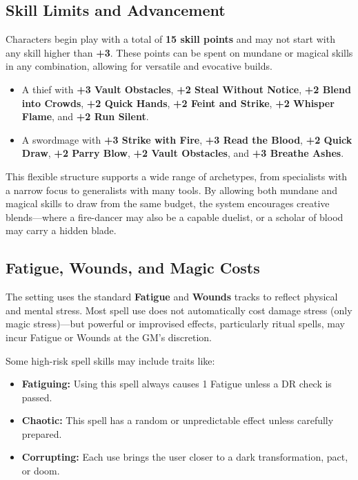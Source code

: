 \subsection{Skill Limits and Advancement}

Characters begin play with a total of \textbf{15 skill points} and may not start with any skill higher than \textbf{+3}. These points can be spent on mundane or magical skills in any combination, allowing for versatile and evocative builds.

\begin{itemize}\raggedright
    \item A thief with \textbf{+3 Vault Obstacles}, \textbf{+2 Steal Without Notice}, \textbf{+2 Blend into Crowds}, \textbf{+2 Quick Hands}, \textbf{+2 Feint and Strike}, \textbf{+2 Whisper Flame}, and \textbf{+2 Run Silent}.
    
    \item A swordmage with \textbf{+3 Strike with Fire}, \textbf{+3 Read the Blood}, \textbf{+2 Quick Draw}, \textbf{+2 Parry Blow}, \textbf{+2 Vault Obstacles}, and \textbf{+3 Breathe Ashes}.
\end{itemize}

This flexible structure supports a wide range of archetypes, from specialists with a narrow focus to generalists with many tools. By allowing both mundane and magical skills to draw from the same budget, the system encourages creative blends—where a fire-dancer may also be a capable duelist, or a scholar of blood may carry a hidden blade.

\subsection{Fatigue, Wounds, and Magic Costs}

The setting uses the standard \textbf{Fatigue} and \textbf{Wounds} tracks to reflect physical and mental stress. Most spell use does not automatically cost damage stress (only magic stress)—but powerful or improvised effects, particularly ritual spells, may incur Fatigue or Wounds at the GM’s discretion.

Some high-risk spell skills may include traits like:

\begin{itemize}
    \item \textbf{Fatiguing:} Using this spell always causes 1 Fatigue unless a DR check is passed.
    \item \textbf{Chaotic:} This spell has a random or unpredictable effect unless carefully prepared.
    \item \textbf{Corrupting:} Each use brings the user closer to a dark transformation, pact, or doom.
\end{itemize}

